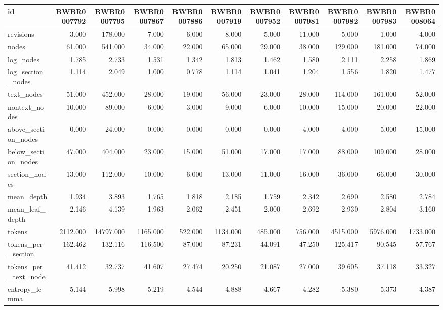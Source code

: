\begin{tabular}{lrrrrrrrrrr}
\toprule
id & BWBR0007792 & BWBR0007795 & BWBR0007867 & BWBR0007886 & BWBR0007919 & BWBR0007952 & BWBR0007981 & BWBR0007982 & BWBR0007983 & BWBR0008064 \\
\midrule
revisions & 3.000 & 178.000 & 7.000 & 6.000 & 8.000 & 5.000 & 11.000 & 5.000 & 1.000 & 4.000 \\
\cline{1-11}
nodes & 61.000 & 541.000 & 34.000 & 22.000 & 65.000 & 29.000 & 38.000 & 129.000 & 181.000 & 74.000 \\
\cline{1-11}
log\_nodes & 1.785 & 2.733 & 1.531 & 1.342 & 1.813 & 1.462 & 1.580 & 2.111 & 2.258 & 1.869 \\
\cline{1-11}
log\_section\_nodes & 1.114 & 2.049 & 1.000 & 0.778 & 1.114 & 1.041 & 1.204 & 1.556 & 1.820 & 1.477 \\
\cline{1-11}
text\_nodes & 51.000 & 452.000 & 28.000 & 19.000 & 56.000 & 23.000 & 28.000 & 114.000 & 161.000 & 52.000 \\
\cline{1-11}
nontext\_nodes & 10.000 & 89.000 & 6.000 & 3.000 & 9.000 & 6.000 & 10.000 & 15.000 & 20.000 & 22.000 \\
\cline{1-11}
above\_section\_nodes & 0.000 & 24.000 & 0.000 & 0.000 & 0.000 & 0.000 & 4.000 & 4.000 & 5.000 & 15.000 \\
\cline{1-11}
below\_section\_nodes & 47.000 & 404.000 & 23.000 & 15.000 & 51.000 & 17.000 & 17.000 & 88.000 & 109.000 & 28.000 \\
\cline{1-11}
section\_nodes & 13.000 & 112.000 & 10.000 & 6.000 & 13.000 & 11.000 & 16.000 & 36.000 & 66.000 & 30.000 \\
\cline{1-11}
mean\_depth & 1.934 & 3.893 & 1.765 & 1.818 & 2.185 & 1.759 & 2.342 & 2.690 & 2.580 & 2.784 \\
\cline{1-11}
mean\_leaf\_depth & 2.146 & 4.139 & 1.963 & 2.062 & 2.451 & 2.000 & 2.692 & 2.930 & 2.804 & 3.160 \\
\cline{1-11}
tokens & 2112.000 & 14797.000 & 1165.000 & 522.000 & 1134.000 & 485.000 & 756.000 & 4515.000 & 5976.000 & 1733.000 \\
\cline{1-11}
tokens\_per\_section & 162.462 & 132.116 & 116.500 & 87.000 & 87.231 & 44.091 & 47.250 & 125.417 & 90.545 & 57.767 \\
\cline{1-11}
tokens\_per\_text\_node & 41.412 & 32.737 & 41.607 & 27.474 & 20.250 & 21.087 & 27.000 & 39.605 & 37.118 & 33.327 \\
\cline{1-11}
entropy\_lemma & 5.144 & 5.998 & 5.219 & 4.544 & 4.888 & 4.667 & 4.282 & 5.380 & 5.373 & 4.387 \\

\end{tabular}
